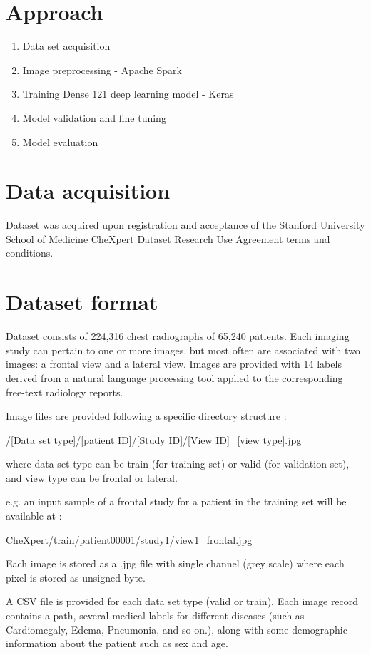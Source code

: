 \documentclass{amia}
\begin{document}
\section*{Approach}
\begin{enumerate}
\item Data set acquisition
\item Image preprocessing - Apache Spark
\item Training Dense 121 deep learning model - Keras
\item Model validation and fine tuning
\item Model evaluation
\end{enumerate}

\section*{Data acquisition }
Dataset was acquired upon registration and acceptance of the Stanford University School of Medicine CheXpert Dataset Research Use Agreement terms and conditions.\cite{ref2}

\section*{Dataset format}

Dataset consists of 224,316 chest radiographs of 65,240 patients. Each imaging study can pertain to one or more images, but most often are associated with two images: a frontal view and a lateral view. Images are provided with 14 labels derived from a natural language processing tool applied to the corresponding free-text radiology reports.

Image files are provided following a specific directory structure :

/[Data set type]/[patient ID]/[Study ID]/[View ID]\_[view type].jpg

where data set type can be train (for training set) or valid (for validation set), and view type can be frontal or lateral.

e.g. an input sample of a frontal study for a patient in the training set will be available at :

CheXpert/train/patient00001/study1/view1\_frontal.jpg

Each image is stored as a .jpg file with single channel (grey scale) where each pixel is stored as unsigned byte.

A CSV file is provided for each data set type (valid or train). Each image record contains a path, several medical labels for different diseases (such as Cardiomegaly, Edema, Pneumonia, and so on.), along with some demographic information about the patient such as sex and age.
\end{document}
